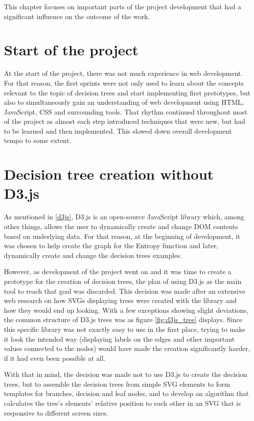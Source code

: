 
This chapter focuses on important parts of the project development that had a significant influence on the outcome of the work.

\section{Start of the project}
At the start of the project, there was not much experience in web development. For that reason, the first sprints were not only used to learn about the concepts relevant to the topic of decision trees and start implementing first prototypes, but also to simultaneously gain an understanding of web development using HTML, JavaScript, CSS and surrounding tools. That rhythm continued throughout most of the project as almost each step introduced techniques that were new, but had to be learned and then implemented. This slowed down overall development tempo to some extent.

\section{Decision tree creation without D3.js}
As mentioned in \ref{d3js}, D3.js is an open-source JavaScript library which, among other things, allows the user to dynamically create and change DOM contents based on underlying data. For that reason, at the beginning of development, it was chosen to help create the graph for the Entropy function and later, dynamically create and change the decision trees examples.

However, as development of the project went on and it was time to create a prototype for the creation of decision trees, the plan of using D3.js as the main tool to reach that goal was discarded. This decision was made after an extensive web research on how SVGs displaying trees were created with the library and how they would end up looking. With a few exceptions showing slight deviations, the common structure of D3.js trees was as figure \ref{fig:d3js_tree} displays.
Since this specific library was not exactly easy to use in the first place, trying to make it look the intended way (displaying labels on the edges and other important values connected to the nodes) would have made the creation significantly harder, if it had even been possible at all.

With that in mind, the decision was made not to use D3.js to create the decision trees, but to assemble the decision trees from simple SVG elements to form templates for branches, decision and leaf nodes, and to develop an algorithm that calculates the tree's elements' relative position to each other in an SVG that is responsive to different screen sizes.


